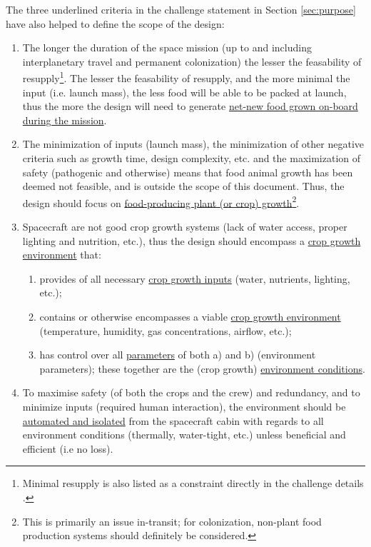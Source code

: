 \documentclass{report}
\begin{document}
The three underlined criteria in the challenge statement in Section \ref{sec:purpose} have also helped to define the scope of the design:
\begin{enumerate}[label=SC\arabic*., ref=SC\arabic*]
\item \label{sc:1} The longer the duration of the space mission (up to and including interplanetary travel and permanent colonization) the lesser the feasability of
    resupply\footnote{Minimal resupply is also listed as a constraint directly in the challenge details \cite{applicantguide,dsfc-phase2}.}.
    The lesser the feasability of resupply, and the more minimal the input (i.e. launch mass), the less food will be able to be packed at launch, thus the more the design will need to generate \uline{net-new food grown on-board during the mission}.
\item \label{sc:2} The minimization of inputs (launch mass), the minimization of other negative criteria such as growth time, design complexity, etc. and the maximization of safety (pathogenic and otherwise) means that food animal growth has been deemed not feasible, and is outside the scope of this document. Thus, the design should focus on \uline{food-producing plant (or crop)
    growth}\footnote{This is primarily an issue in-transit; for colonization, non-plant food production systems should definitely be considered.}.
\item \label{sc:3} Spacecraft are not good crop growth systems (lack of water access, proper lighting and nutrition, etc.), thus the design should encompass a \uline{crop growth environment} that:
    \begin{enumerate}[label=SC3\alph*., ref=SC3\alph*]
        \item \label{sc:3a} provides of all necessary \uline{crop growth inputs} (water, nutrients, lighting, etc.);
        \item \label{sc:3b} contains or otherwise encompasses a viable \uline{crop growth environment} (temperature, humidity, gas concentrations, airflow, etc.);
        \item \label{sc:3c} has control over all \uline{parameters} of both a) and b) (environment parameters); these together are the (crop growth) \uline{environment conditions}.
    \end{enumerate}
\item \label{sc:4} To maximise safety (of both the crops and the crew) and redundancy, and to minimize inputs (required human interaction), the environment should be \uline{automated and isolated} from the spacecraft cabin with regards to all environment conditions (thermally, water-tight, etc.) unless beneficial and efficient (i.e no loss).

\end{enumerate}
\end{document}
